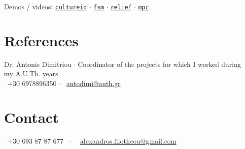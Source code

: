 \documentclass[a4paper,10pt,twoside]{article}
\begin{document}
Demos / videos: \href{https://cultureid.web.auth.gr/?page\_id=200&lang=en}{\texttt{cultureid}} $\cdot$ \href{https://www.youtube.com/watch?v=hB4qsHCEXGI}{\texttt{fsm}} $\cdot$ \href{https://relief.web.auth.gr/}{\texttt{relief}} $\cdot$ \href{https://www.youtube.com/watch?v=937OZez1iN8}{\texttt{mpc}}
\\

\section{References}
Dr. Antonis Dimitriou $\cdot$ Coordinator of the projects for which I worked during my A.U.Th. years \\
\faPhone \ +30 6978896350 $\cdot$ \faEnvelopeO \ \href{mailto:antodimi@auth.gr}{antodimi@auth.gr} \\


\section{Contact}

\begin{center}
  \faPhone \ +30 693 87 87 677 \ $\cdot$ \ \faEnvelopeO \ \href{mailto:alexandros.filotheou@gmail.com}{alexandros.filotheou@gmail.com}
\end{center}
\end{document}
